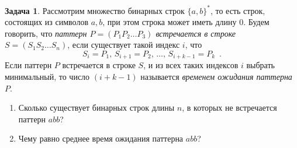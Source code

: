 \documentclass[a5paper]{article}
\theoremstyle{definition}
\newtheorem{problem}{Задача}
\begin{document}
\begin{problem} Рассмотрим множество бинарных строк \( \{ a, b \}^\ast \), то
есть строк, состоящих из символов \( a, b \), при этом строка может иметь длину
\( 0 \). Будем говорить, что \emph{паттерн \( P = (P_1 P_2 \ldots P_3) \)
встречается в строке \( S = (S_1 S_2 \ldots S_n) \)}, если существует такой индекс \( i \), что
\begin{equation}
    S_i = P_1, \, 
    S_{i+1} = P_2, \,
    \ldots, \,
    S_{i+k-1} = P_k \enspace .
\end{equation}
Если паттерн \( P \) встречается в строке \( S \), и из всех таких индексов \( i
\) выбрать минимальный, то число \( (i+k-1) \) называется \emph{временем
ожидания паттерна \( P \)}.
\begin{enumerate}
\item Сколько существует бинарных строк длины \( n \), в которых не встречается
паттерн \( abb \)? 
\item Чему равно среднее время ожидания паттерна \( abb \)?
\end{enumerate}
\end{problem}       
\end{document}
